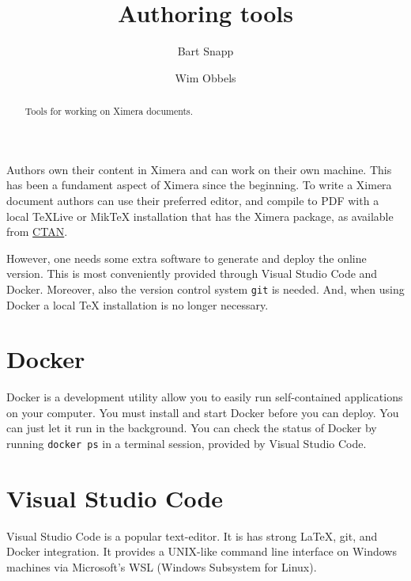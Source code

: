 \documentclass{ximera}
\title{Authoring tools}
\author{Bart Snapp \and Wim Obbels}
\begin{document}
\begin{abstract}
      Tools for working on Ximera documents.
\end{abstract}
\maketitle

Authors own their content in Ximera and can work on their own machine. This has
been a fundament aspect of Ximera since the beginning. 
To write a Ximera document authors can use their preferred editor, and compile to PDF 
with a local TeXLive or MikTeX installation that has the Ximera package, 
as available from \href{https://ctan.org/pkg/ximera}{CTAN}.

However, one needs some extra software to generate and deploy the online version. 
This is most conveniently provided through Visual Studio Code and Docker.
Moreover, also the version control system \verb!git! is needed.
And, when using Docker a local TeX installation is no longer necessary.


\section{Docker}

Docker is a development utility allow you to easily run self-contained applications on your
computer. You must install and start Docker before you can deploy. You can just let
it run in the background. You can check the status of Docker by running
\verb!docker ps! in a terminal session, provided by Visual Studio Code.

\section{Visual Studio Code}

Visual Studio Code
is a popular text-editor. It is has strong \LaTeX, git,
and Docker integration. It provides a UNIX-like command line interface on
Windows machines via Microsoft's WSL (Windows Subsystem for Linux).
\end{document}

